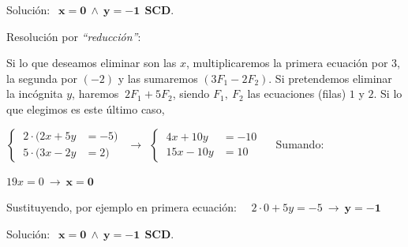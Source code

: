\begin{miejemplo}
\vspace{2mm} Solución:  $\ \ \boldsymbol{x=0\ \wedge \ y=-1} \ \ \textbf{SCD}.$

\vspace{7mm} Resolución por \emph{``reducción''}:

\vspace{2mm} Si lo que deseamos eliminar son las $x$, multiplicaremos la primera ecuación por $3$, la segunda por $(-2)$ y las sumaremos \textcolor{gris}{$(3F_1-2F_2)$}. Si pretendemos eliminar la incógnita $y$, haremos $\ 2F_1+5F_2$, siendo $F_1,\ F_2$ las ecuaciones (filas) $1$ y $2$. Si lo que elegimos es este último caso,

\vspace{2mm} $\begin{cases} \ 2\cdot(2x+5y&=-5)\\ \ 5\cdot(3x-2y&=2) \end{cases} \ \ \to \ \ \begin{cases} \ 4x+10y&=-10 \\ \ 15x-10y&=10 \end{cases} \quad $ Sumando:

\vspace{2mm} $19x=0 \ \to \ \boldsymbol{x=0}$

\vspace{2mm} Sustituyendo, por ejemplo en primera ecuación: $\quad 2\cdot 0 + 5y=-5 \ \to \ \boldsymbol{y=-1}$

\vspace{2mm} Solución:  $\ \ \boldsymbol{x=0\ \wedge \ y=-1} \ \ \textbf{SCD}.$

\end{miejemplo}


